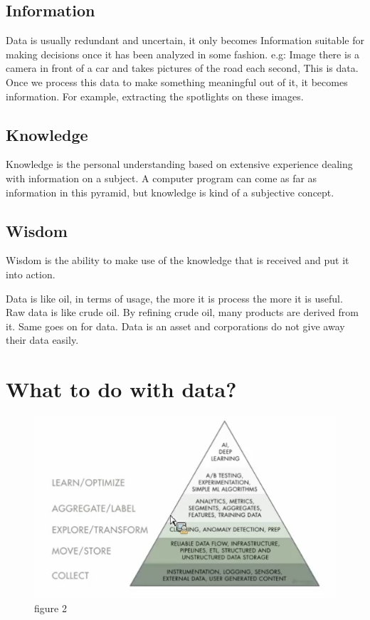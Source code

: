 \documentclass[twocolumn,a4paper, 10pt]{article}
\begin{document}
	\subsection{Information}
		Data is usually redundant and uncertain, it only becomes Information suitable for making decisions 
		once it has been analyzed in some fashion. e.g: Image there is a camera in front of a car and
		takes pictures of the road each second, This is data. Once we process this data to make something 
		meaningful out of it, it becomes information. For example, extracting the spotlights on these images.

	\subsection{Knowledge}
		Knowledge is the personal understanding based on extensive experience dealing with information on a subject.
		A computer program can come as far as information in this pyramid, but knowledge is kind of a subjective concept.
	
	\subsection{Wisdom}
		Wisdom is the ability to make use of the knowledge that is received and put it into action.
	
	Data is like oil, in terms of usage, the more it is process the more it is useful. Raw data is like crude oil.
	By refining crude oil, many products are derived from it. Same goes on for data. 
	Data is an asset and corporations do not give away their data easily.
	
	\section{What to do with data?}

	\begin{figure}[h]
		\centering
		\includegraphics[scale=0.45]{./img/fig2.png}
		\caption{figure 2}
	\end{figure}
\end{document}
